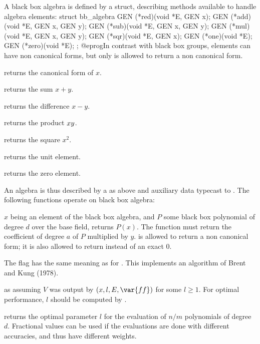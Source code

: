 A black box algebra is defined by a  struct, describing methods
available to handle algebra elements:
\bprog
struct bb_algebra
{
  GEN (*red)(void *E, GEN x);
  GEN (*add)(void *E, GEN x, GEN y);
  GEN (*sub)(void *E, GEN x, GEN y);
  GEN (*mul)(void *E, GEN x, GEN y);
  GEN (*sqr)(void *E, GEN x);
  GEN (*one)(void *E);
  GEN (*zero)(void *E);
};
@eprog\noindent In contrast with black box groups, elements can have non
canonical forms, but only  is allowed to return a non canonical
form.

 returns the canonical form of $x$.

 returns the sum $x+y$.

 returns the difference $x-y$.

 returns the product $x\*y$.

 returns the square $x^2$.

 returns the unit element.

 returns the zero element.

\noindent An algebra is thus described by a  as above
and auxiliary data typecast to . The following functions operate
on black box algebra:

$x$ being an element of the black box algebra, and $P$ some black box
polynomial of degree $d$ over the base field,  returns $P(x)$. The function
 must return the coefficient of degree $a$ of $P$
multiplied by $y$.  is allowed to return a non canonical form;
it is also allowed to return  instead of an exact $0$.

The flag  has the same meaning as for . This
implements an algorithm of Brent and Kung (1978).

as  assuming $V$ was output by
$(x, l, E, \var{ff})$ for some $l\geq 1$. For optimal
performance, $l$ should be computed by .

 returns the optimal
parameter $l$ for the evaluation of $n/m$ polynomials of degree $d$.
Fractional values can be used if the evaluations are done with different
accuracies, and thus have different weights.

